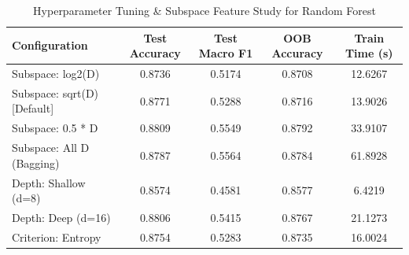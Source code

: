 \begin{table}[htbp]
\centering
\caption{Hyperparameter Tuning & Subspace Feature Study for Random Forest}
\label{tab:hyperparameter_study}
\begin{tabular}{lcccc}
\toprule
Configuration & Test Accuracy & Test Macro F1 & OOB Accuracy & Train Time (s) \\
\midrule
Subspace: log2(D) & 0.8736 & 0.5174 & 0.8708 & 12.6267 \\
Subspace: sqrt(D) [Default] & 0.8771 & 0.5288 & 0.8716 & 13.9026 \\
Subspace: 0.5 * D & 0.8809 & 0.5549 & 0.8792 & 33.9107 \\
Subspace: All D (Bagging) & 0.8787 & 0.5564 & 0.8784 & 61.8928 \\
Depth: Shallow (d=8) & 0.8574 & 0.4581 & 0.8577 & 6.4219 \\
Depth: Deep (d=16) & 0.8806 & 0.5415 & 0.8767 & 21.1273 \\
Criterion: Entropy & 0.8754 & 0.5283 & 0.8735 & 16.0024 \\
\bottomrule
\end{tabular}
\end{table}